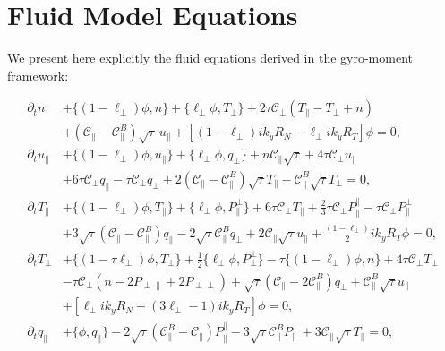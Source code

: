 \section{Fluid Model Equations}

We present here explicitly the fluid equations derived in the gyro-moment framework:

\begin{align}
\partial_t n &+ \{(1 - \ell_\perp)\phi, n\} + \{\ell_\perp \phi, T_\perp\} + 2\tau \mathcal{C}_\perp(T_\parallel - T_\perp + n) \nonumber\\
&+ (\mathcal{C}_\parallel - \mathcal{C}_\parallel^B)\sqrt{\tau}\, u_\parallel + \left[(1 - \ell_\perp)i k_y R_N - \ell_\perp i k_y R_T\right]\phi = 0,\\
\partial_t u_\parallel &+ \{(1 - \ell_\perp)\phi, u_\parallel\} + \{\ell_\perp \phi, q_\perp\} + n \mathcal{C}_\parallel\sqrt{\tau} + 4 \tau \mathcal{C}_\perp u_\parallel \nonumber\\
&+ 6\tau \mathcal{C}_\perp q_\parallel - \tau \mathcal{C}_\perp q_\perp + 2(\mathcal{C}_\parallel - \mathcal{C}_\parallel^B)\sqrt{\tau} T_\parallel - \mathcal{C}_\parallel^B\sqrt{\tau} T_\perp = 0,\\
\partial_t T_\parallel &+ \{(1 - \ell_\perp)\phi, T_\parallel\} + \{\ell_\perp \phi, P_\parallel^\perp\} + 6\tau \mathcal{C}_\perp T_\parallel + \frac{2}{3}\tau \mathcal{C}_\perp P_\parallel^\parallel - \tau \mathcal{C}_\perp P_\parallel^\perp \nonumber\\
&+ 3\sqrt{\tau}(\mathcal{C}_\parallel - \mathcal{C}_\parallel^B) q_\parallel - 2\sqrt{\tau} \mathcal{C}_\parallel^B q_\perp + 2 \mathcal{C}_\parallel\sqrt{\tau} u_\parallel + \frac{(1 - \ell_\perp)}{2}i k_y R_T \phi = 0,\\
\partial_t T_\perp &+ \{(1 - \tau \ell_\perp)\phi, T_\perp\} + \frac{1}{2}\{\ell_\perp \phi, P_\perp^\perp\} - \tau\{(1 - \ell_\perp)\phi, n\} + 4\tau \mathcal{C}_\perp T_\perp \nonumber\\
&- \tau \mathcal{C}_\perp(n - 2P_{\perp\parallel} + 2P_{\perp\perp}) + \sqrt{\tau}(\mathcal{C}_\parallel - 2\mathcal{C}_\parallel^B) q_\perp + \mathcal{C}_\parallel^B\sqrt{\tau} u_\parallel \nonumber\\
&+ \left[\ell_\perp i k_y R_N + (3\ell_\perp - 1) i k_y R_T\right]\phi = 0,\\
\partial_t q_\parallel &+ \{\phi, q_\parallel\} - 2\sqrt{\tau}(\mathcal{C}_\parallel^B - \mathcal{C}_\parallel)P_\parallel^\parallel - 3\sqrt{\tau} \mathcal{C}_\parallel^B P_\parallel^\perp + 3 \mathcal{C}_\parallel\sqrt{\tau} T_\parallel = 0,\\

\end{align}
